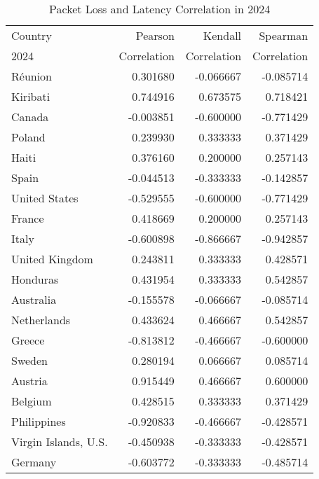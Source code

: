 \begin{table}
	\footnotesize
	\caption{Packet Loss and Latency Correlation in 2024}
	\label{fig:packetloss-latency-correlation-2024}
	\begin{tabular}{lrrr}
		\toprule
		Country              & Pearson     & Kendall     & Spearman    \\
		2024                 & Correlation & Correlation & Correlation \\
		\midrule
		Réunion              & 0.301680    & -0.066667   & -0.085714   \\
		Kiribati             & 0.744916    & 0.673575    & 0.718421    \\
		Canada               & -0.003851   & -0.600000   & -0.771429   \\
		Poland               & 0.239930    & 0.333333    & 0.371429    \\
		Haiti                & 0.376160    & 0.200000    & 0.257143    \\
		Spain                & -0.044513   & -0.333333   & -0.142857   \\
		United States        & -0.529555   & -0.600000   & -0.771429   \\
		France               & 0.418669    & 0.200000    & 0.257143    \\
		Italy                & -0.600898   & -0.866667   & -0.942857   \\
		United Kingdom       & 0.243811    & 0.333333    & 0.428571    \\
		Honduras             & 0.431954    & 0.333333    & 0.542857    \\
		Australia            & -0.155578   & -0.066667   & -0.085714   \\
		Netherlands          & 0.433624    & 0.466667    & 0.542857    \\
		Greece               & -0.813812   & -0.466667   & -0.600000   \\
		Sweden               & 0.280194    & 0.066667    & 0.085714    \\
		Austria              & 0.915449    & 0.466667    & 0.600000    \\
		Belgium              & 0.428515    & 0.333333    & 0.371429    \\
		Philippines          & -0.920833   & -0.466667   & -0.428571   \\
		Virgin Islands, U.S. & -0.450938   & -0.333333   & -0.428571   \\
		Germany              & -0.603772   & -0.333333   & -0.485714   \\
		\bottomrule
	\end{tabular}
\end{table}

